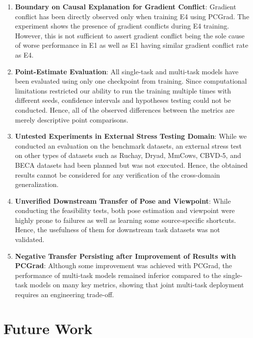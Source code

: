 \begin{enumerate}
    \item \textbf{Boundary on Causal Explanation for Gradient Conflict}: Gradient conflict has been directly observed only when training E4 using PCGrad. The experiment shows the presence of gradient conflicts during E4 training. However, this is not sufficient to assert gradient conflict being the sole cause of worse performance in E1 as well as E1 having similar gradient conflict rate as E4.
    \item \textbf{Point-Estimate Evaluation}: All single-task and multi-task models have been evaluated using only one checkpoint from training. Since computational limitations restricted our ability to run the training multiple times with different seeds, confidence intervals and hypotheses testing could not be conducted. Hence, all of the observed differences between the metrics are merely descriptive point comparisons.
    \item \textbf{Untested Experiments in External Stress Testing Domain}: While we conducted an evaluation on the benchmark datasets, an external stress test on other types of datasets such as Ruchay, Dryad, MmCows, CBVD-5, and BECA datasets had been planned but was not executed. Hence, the obtained results cannot be considered for any verification of the cross-domain generalization.
    \item \textbf{Unverified Downstream Transfer of Pose and Viewpoint}: While conducting the feasibility tests, both pose estimation and viewpoint were highly prone to failures as well as learning some source-specific shortcuts. Hence, the usefulness of them for downstream task datasets was not validated.
    \item \textbf{Negative Transfer Persisting after Improvement of Results with PCGrad}: Although some improvement was achieved with PCGrad, the performance of multi-task models remained inferior compared to the single-task models on many key metrics, showing that joint multi-task deployment requires an engineering trade-off.
\end{enumerate}

\section{Future Work}

